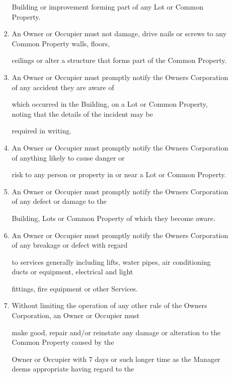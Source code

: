 \documentclass{article}
\begin{document}
\begin{enumerate}[label=\arabic*.]
\begin{enumerate}[label=\arabic{enumi}.\arabic*.]
\begin{enumerate}[label=(\arabic*)]
{\fontsize{10.02}{1}Building or improvement forming part of any Lot or Common Property. }

\item {\fontsize{9.962}{1} An Owner or Occupier must not damage, drive nails or screws to any Common Property walls, floors, }

{\fontsize{10.02}{1}ceilings or alter a structure that forms part of the Common Property. }

\newpage

\item {\fontsize{9.962}{1} An Owner or Occupier must promptly notify the Owners Corporation of any accident they are aware of }

{\fontsize{10.02}{1}which occurred in the Building, on a Lot or Common Property, noting that the details of the incident may be }

{\fontsize{10.02}{1}required in writing. }

\item {\fontsize{9.962}{1} An Owner or Occupier must promptly notify the Owners Corporation of anything likely to cause danger or }

{\fontsize{10.02}{1}risk to any person or property in or near a Lot or Common Property. }

\item {\fontsize{9.962}{1} An Owner or Occupier must promptly notify the Owners Corporation of any defect or damage to the }

{\fontsize{10.02}{1}Building, Lots or Common Property of which they become aware. }

\item {\fontsize{9.962}{1} An Owner or Occupier must promptly notify the Owners Corporation of any breakage or defect with regard }

{\fontsize{10.02}{1}to services generally including lifts, water pipes, air conditioning ducts or equipment, electrical and light }

{\fontsize{10.02}{1}fittings, fire equipment or other Services. }

\item {\fontsize{9.962}{1} Without limiting the operation of any other rule of the Owners Corporation, an Owner or Occupier must }

{\fontsize{10.02}{1}make good, repair and/or reinstate any damage or alteration to the Common Property caused by the }

{\fontsize{10.02}{1}Owner or Occupier with 7 days or such longer time as the Manager deems appropriate having regard to the }


\end{enumerate}
\end{enumerate}
\end{enumerate}
\end{document}
